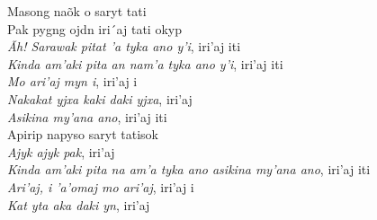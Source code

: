 \begin{linenumbers}\begingroup\raggedright
\noindent Masong naõk o saryt tati\\
Pak pygng ojdn iri´aj tati okyp\\
\emph{Ãh! Sarawak pitat 'a tyka ano y'i}, iri'aj iti\\
\emph{Kinda am'aki pita an nam'a tyka ano y'i}, iri'aj iti\\
\emph{Mo ari'aj myn i}, iri'aj i\\
\emph{Nakakat yjxa kaki daki yjxa}, iri'aj\\
\emph{Asikina my'ana ano}, iri'aj iti\\
Apirip napyso saryt tatisok\\
\emph{Ajyk ajyk pak}, iri'aj\\
\emph{Kinda am'aki pita na am'a tyka ano asikina my'ana ano}, iri'aj iti\\
\emph{Ari'aj, i 'a'omaj mo ari'aj}, iri'aj i\\
\emph{Kat yta aka daki yn}, iri'aj

\end{linenumbers}\endgroup

\bigskip

